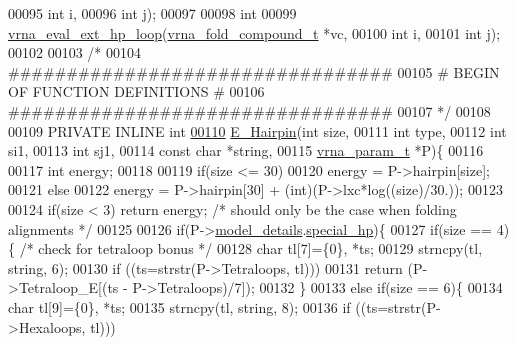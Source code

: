 \begin{DoxyCode}
00095                   \textcolor{keywordtype}{int} i,
00096                   \textcolor{keywordtype}{int} j);
00097 
00098 \textcolor{keywordtype}{int}
00099 \hyperlink{group__eval_gad3b92453a6b501856eec8fae39f3235d}{vrna\_eval\_ext\_hp\_loop}(\hyperlink{group__fold__compound_structvrna__fc__s}{vrna\_fold\_compound\_t} *vc,
00100                       \textcolor{keywordtype}{int} i,
00101                       \textcolor{keywordtype}{int} j);
00102 
00103 \textcolor{comment}{/*}
00104 \textcolor{comment}{#################################}
00105 \textcolor{comment}{# BEGIN OF FUNCTION DEFINITIONS #}
00106 \textcolor{comment}{#################################}
00107 \textcolor{comment}{*/}
00108 
00109 PRIVATE INLINE \textcolor{keywordtype}{int}
\hypertarget{hairpin__loops_8h_source.tex_l00110}{}\hyperlink{group__loops_gadf943ee9a45b7f4cee9192c06210dace}{00110} \hyperlink{group__loops_gadf943ee9a45b7f4cee9192c06210dace}{E\_Hairpin}(\textcolor{keywordtype}{int} size,
00111           \textcolor{keywordtype}{int} type,
00112           \textcolor{keywordtype}{int} si1,
00113           \textcolor{keywordtype}{int} sj1,
00114           \textcolor{keyword}{const} \textcolor{keywordtype}{char} *\textcolor{keywordtype}{string},
00115           \hyperlink{group__energy__parameters_structvrna__param__s}{vrna\_param\_t} *P)\{
00116 
00117   \textcolor{keywordtype}{int} energy;
00118 
00119   \textcolor{keywordflow}{if}(size <= 30)
00120     energy = P->hairpin[size];
00121   \textcolor{keywordflow}{else}
00122     energy = P->hairpin[30] + (int)(P->lxc*log((size)/30.));
00123 
00124   \textcolor{keywordflow}{if}(size < 3) \textcolor{keywordflow}{return} energy; \textcolor{comment}{/* should only be the case when folding alignments */}
00125 
00126   \textcolor{keywordflow}{if}(P->\hyperlink{group__energy__parameters_a7b84353eb9075c595bad4ceb871bcae7}{model\_details}.\hyperlink{group__model__details_add64a96d23e77ef1d0ddf8dfc5228143}{special\_hp})\{
00127     \textcolor{keywordflow}{if}(size == 4)\{ \textcolor{comment}{/* check for tetraloop bonus */}
00128       \textcolor{keywordtype}{char} tl[7]=\{0\}, *ts;
00129       strncpy(tl, \textcolor{keywordtype}{string}, 6);
00130       \textcolor{keywordflow}{if} ((ts=strstr(P->Tetraloops, tl)))
00131         \textcolor{keywordflow}{return} (P->Tetraloop\_E[(ts - P->Tetraloops)/7]);
00132     \}
00133     \textcolor{keywordflow}{else} \textcolor{keywordflow}{if}(size == 6)\{
00134       \textcolor{keywordtype}{char} tl[9]=\{0\}, *ts;
00135       strncpy(tl, \textcolor{keywordtype}{string}, 8);
00136       \textcolor{keywordflow}{if} ((ts=strstr(P->Hexaloops, tl)))

\end{DoxyCode}
